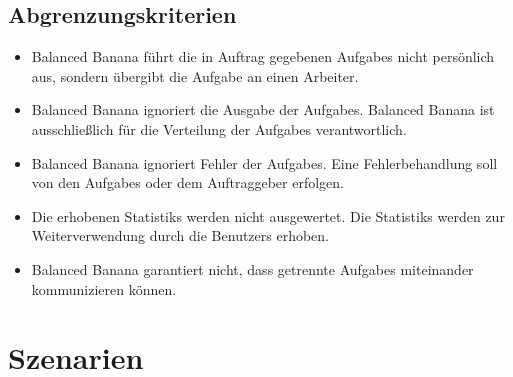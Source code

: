 \documentclass[a4paper,12pt]{article}
\begin{document}
\subsection{Abgrenzungskriterien}
\begin{itemize}[nosep]

	\item Balanced Banana führt die in Auftrag gegebenen \glspl{Aufgabe} nicht persönlich aus, sondern übergibt die \gls{Aufgabe} an einen \gls{Arbeiter}.
	
	\item Balanced Banana ignoriert die Ausgabe der \glspl{Aufgabe}. Balanced Banana ist ausschließlich für die Verteilung der \glspl{Aufgabe} verantwortlich.

	\item Balanced Banana ignoriert Fehler der \glspl{Aufgabe}. Eine \gls{Fehlerbehandlung} soll von den \glspl{Aufgabe} oder dem \gls{Auftraggeber} erfolgen.

	\item Die erhobenen \glspl{Statistik} werden nicht ausgewertet. Die \glspl{Statistik} werden zur Weiterverwendung durch die \glspl{Benutzer} erhoben.
	
	\item Balanced Banana garantiert nicht, dass getrennte \glspl{Aufgabe} miteinander kommunizieren können.
	
\end{itemize}



\clearpage
\section{Szenarien}
\end{document}
